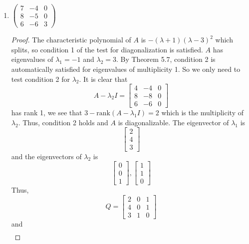 \documentclass[11pt]{scrartcl}
\begin{document}
\begin{enumerate}[label=\alph*.]
{\begin{proof}
		      as desired.
	      \end{proof}
	      }
	\item{
	      $\left(\begin{array}{ccc}7 & -4 & 0 \\ 8 & -5 & 0 \\ 6 & -6 & 3\end{array}\right)$
	      \begin{proof}
		      The characteristic polynomial of $A$ is $-(\lambda+1)(\lambda-3)^2$
		      which splits, so condition 1 of the test for diagonalization is satisfied.
		      $A$ has eigenvalues of $\lambda_1 = -1 $ and $\lambda_2 = 3$.
		      By Theorem 5.7, condition 2 is automatically satisfied for eigenvalues of multiplicity 1.
		      So we only need to test condition 2 for $\lambda_2$.
		      It is clear that
		      \[
			      A - \lambda_2 I =
			      \begin{bmatrix}
				      4 & -4 & 0 \\
				      8 & -8 & 0 \\
				      6 & -6 & 0
			      \end{bmatrix}
		      \]
		      has rank 1, we see that $3 - \text{rank}(A - \lambda_1 I) = 2$ which is the multiplicity of $\lambda_2$.
		      Thus, condition 2 holds and $A$ is diagonalizable. The eigenvector of $\lambda_1$ is
		      \[
			      \begin{bmatrix}
				      2 \\
				      4 \\
				      3
			      \end{bmatrix}
		      \]
		      and the eigenvectors of $\lambda_2$ is
		      \[
			      \begin{bmatrix}
				      0 \\
				      0 \\
				      1
			      \end{bmatrix},
			      \begin{bmatrix}
				      1 \\
				      1 \\
				      0
			      \end{bmatrix}
		      \]
		      Thus,
		      \[
			      Q =
			      \begin{bmatrix}
				      2 & 0 & 1 \\
				      4 & 0 & 1 \\
				      3 & 1 & 0
			      \end{bmatrix}
		      \]
		      and
		      \begin{align*}

\end{align*}
\end{proof}}
\end{enumerate}
\end{document}
